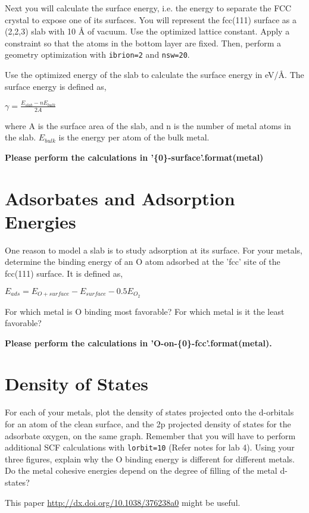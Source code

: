 \documentclass[11pt]{article}
\begin{document}
Next you will calculate the surface energy, i.e. the energy to separate the FCC crystal to expose one of its surfaces. You will represent the fcc(111) surface as a (2,2,3) slab with 10 \AA{} of vacuum. Use the optimized lattice constant. Apply a constraint so that the atoms in the bottom layer are fixed. Then, perform a geometry optimization with \verb~ibrion=2~ and \verb~nsw=20~.

Use the optimized energy of the slab to calculate the surface energy in eV/\AA{}. The surface energy is defined as,

$\gamma = \frac{E_{slab} - nE_{bulk}}{2A}$

where A is the surface area of the slab, and n is the number of metal atoms in the slab. $E_{bulk}$ is the energy per atom of the bulk metal.

\textbf{Please perform the calculations in '\{0\}-surface'.format(metal)}

\section{Adsorbates and Adsorption Energies}
\label{sec-6}

One reason to model a slab is to study adsorption at its surface.  For your metals, determine the binding energy of an O atom adsorbed at the 'fcc' site of the fcc(111) surface. It is defined as,

$E_{ads} = E_{O+surface} - E_{surface} - 0.5 E_{O_{2}}$

For which metal is O binding most favorable? For which metal is it the least favorable?

\textbf{Please perform the calculations in 'O-on-\{0\}-fcc'.format(metal).}

\section{Density of States}
\label{sec-7}
For each of your metals, plot the density of states projected onto the d-orbitals for an atom of the clean surface, and the 2p projected density of states for the adsorbate oxygen, on the same graph. Remember that you will have to perform additional SCF calculations with \verb~lorbit=10~ (Refer notes for lab 4). Using your three figures, explain why the O binding energy is different for different metals. Do the metal cohesive energies depend on the degree of filling of the metal d-states?

This paper \url{http://dx.doi.org/10.1038/376238a0} might be useful.
\end{document}
